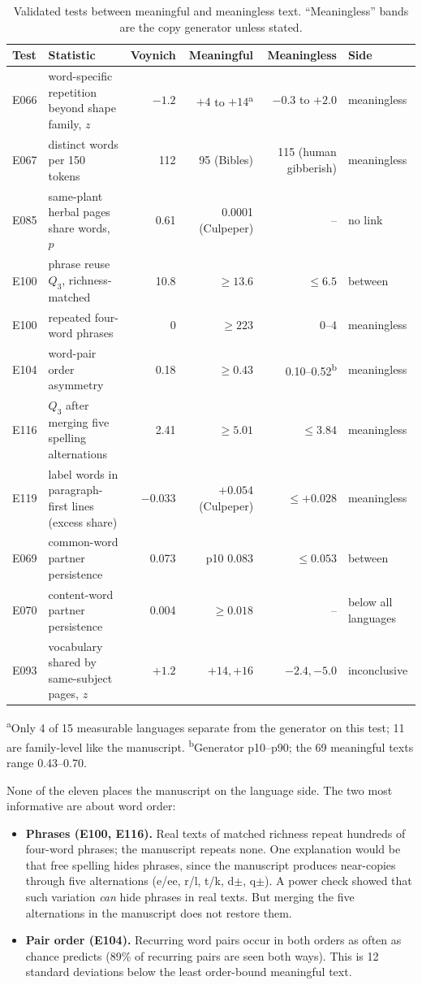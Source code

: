 \documentclass[11pt,a4paper]{article}
\begin{document}
\begin{table}[ht]\small
\caption{Validated tests between meaningful and meaningless text. ``Meaningless'' bands are the copy generator unless stated.}\label{tab:meaning}
\begin{tabularx}{\textwidth}{@{}lYrrrl@{}}\toprule
Test & Statistic & Voynich & Meaningful & Meaningless & Side\\\midrule
E066 & word-specific repetition beyond shape family, $z$ & $-1.2$ & $+4$ to $+14$\textsuperscript{a} & $-0.3$ to $+2.0$ & meaningless\\
E067 & distinct words per 150 tokens & 112 & 95 (Bibles) & 115 (human gibberish) & meaningless\\
E085 & same-plant herbal pages share words, $p$ & 0.61 & 0.0001 (Culpeper) & -- & no link\\
E100 & phrase reuse $Q_3$, richness-matched & 10.8 & $\ge 13.6$ & $\le 6.5$ & between\\
E100 & repeated four-word phrases & 0 & $\ge 223$ & 0--4 & meaningless\\
E104 & word-pair order asymmetry & 0.18 & $\ge 0.43$ & 0.10--0.52\textsuperscript{b} & meaningless\\
E116 & $Q_3$ after merging five spelling alternations & 2.41 & $\ge 5.01$ & $\le 3.84$ & meaningless\\
E119 & label words in paragraph-first lines (excess share) & $-0.033$ & $+0.054$ (Culpeper) & $\le +0.028$ & meaningless\\
E069 & common-word partner persistence & 0.073 & p10 0.083 & $\le 0.053$ & between\\
E070 & content-word partner persistence & 0.004 & $\ge 0.018$ & -- & below all languages\\
E093 & vocabulary shared by same-subject pages, $z$ & $+1.2$ & $+14, +16$ & $-2.4, -5.0$ & inconclusive\\\bottomrule
\end{tabularx}
\footnotesize \textsuperscript{a}Only 4 of 15 measurable languages separate from the generator on this test; 11 are family-level like the manuscript. \textsuperscript{b}Generator p10--p90; the 69 meaningful texts range 0.43--0.70.
\end{table}

None of the eleven places the manuscript on the language side. The two most informative are about word order:
\begin{itemize}
\item \textbf{Phrases (E100, E116).} Real texts of matched richness repeat hundreds of four-word phrases; the manuscript repeats none. One explanation would be that free spelling hides phrases, since the manuscript produces near-copies through five alternations (e/ee, r/l, t/k, d$\pm$, q$\pm$). A power check showed that such variation \emph{can} hide phrases in real texts. But merging the five alternations in the manuscript does not restore them.
\item \textbf{Pair order (E104).} Recurring word pairs occur in both orders as often as chance predicts (89\% of recurring pairs are seen both ways). This is 12 standard deviations below the least order-bound meaningful text.
\end{itemize}
\end{document}
